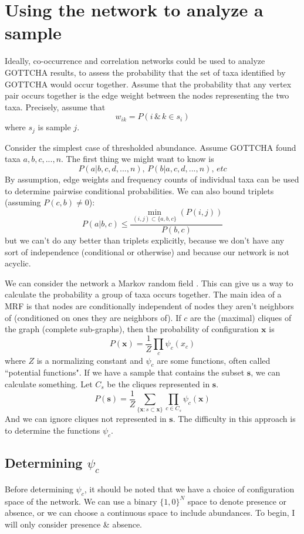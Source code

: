 \documentclass[10pt]{article}
\theoremstyle{definition}
\numberwithin{theorem}{section}
\numberwithin{definition}{section}
\numberwithin{lemma}{section}
\numberwithin{corollary}{section}
\numberwithin{clm}{section}
\numberwithin{rmk}{section}
\renewcommand{\b}{\bm}
\begin{document}
\section{Using the network to analyze a sample}

Ideally, co-occurrence and correlation networks could be used to analyze GOTTCHA results, to assess the probability that the set of taxa identified by GOTTCHA would occur together. Assume that the probability that any vertex pair occurs together is the edge weight between the nodes representing the two taxa. Precisely, assume that
\[
w_{ik} = P(i \, \&\, k \in  s_i)
\]
where $s_j$ is sample $j$. 

Consider the simplest case of thresholded abundance. Assume GOTTCHA found taxa $a,b,c,...,n$. The first thing we might want to know is
\[
P(a | b,c,d,...,n), \, P(b|a,c,d,...,n) ,\, \mathit{etc}
\]
By assumption, edge weights and frequency counts of individual taxa can be used to determine pairwise conditional probabilities. We can also bound triplets (assuming $P(c,b) \neq 0$):
\[
P(a|b,c) \leq \frac{\min_{(i,j) \subset \{a,b,c\}}(P(i,j))}{P(b,c)}
\]
but we can't do any better than triplets explicitly, because we don't have any sort of independence (conditional or otherwise) and because our network is not acyclic. 

We can consider the network a Markov random field \cite{machine_learning}. This can give us a way to calculate the probability a group of taxa occurs together. The main idea of a MRF is that nodes are conditionally independent of nodes they aren't neighbors of (conditioned on ones they are neighbors of). If $c$ are the (maximal) cliques of the graph (complete sub-graphs), then the probability of configuration $\b{x}$ is
\[
P(\b{x}) = \frac{1}{Z} \prod_{c} \psi_c (x_{c})
\]	
where $Z$ is a normalizing constant and $\psi_c$ are some functions, often called ``potential functions"\cite{machine_learning}. If we have a sample that contains the subset $\b{s}$, we can calculate something. Let $C_s$ be the cliques represented in $\b{s}$.
\[
P(\b{s}) = \frac{1}{Z}\sum_{\{\b{x} : s\subset \b{x}\}}\prod_{c\in C_s}\psi_c(\b{x})
\]
And we can ignore cliques not represented in $\b{s}$. The difficulty in this approach is to determine the functions $\psi_c$.

\subsection{Determining $\psi_c$}

Before determining $\psi_c$, it should be noted that we have a choice of configuration space of the network. We can use a binary $\{1,0\}^N$ space to denote presence or absence, or we can choose a continuous space to include abundances. To begin, I will only consider presence \& absence.
\end{document}
